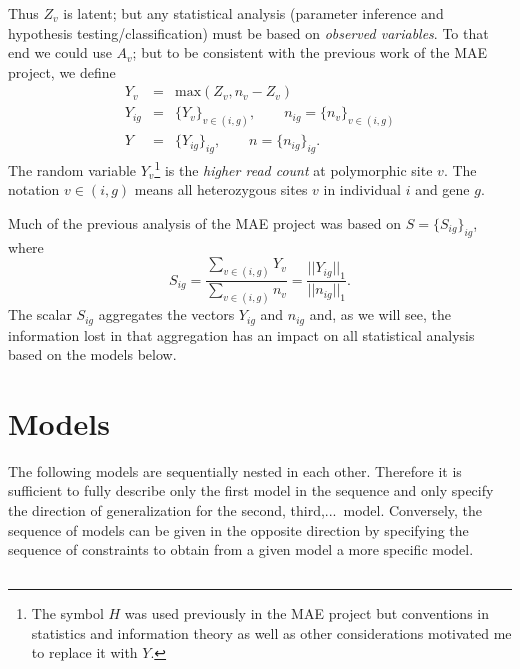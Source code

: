 \documentclass[letterpaper]{article}
\begin{document}
Thus \(Z_v\) is latent; but any statistical analysis (parameter inference and hypothesis
testing/classification) must be based on \emph{observed variables}.  To that
end we could use \(A_v\); but to be consistent with the previous work of the
MAE project, we define 
\begin{eqnarray}
\label{eq:Y-def}
Y_{v} &=& \mathrm{max}(Z_{v}, n_{v} - Z_{v}) \\
Y_{ig} &=&  \{Y_v\}_{v\in(i,g)}, \qquad n_{ig} = \{n_v\}_{v\in(i,g)} \\
Y &=&  \{Y_{ig}\}_{ig}, \qquad n = \{n_{ig}\}_{ig}.
\end{eqnarray}
The random variable \(Y_v\)\footnote{The symbol \(H\) was used previously in
the MAE project but conventions in statistics and information theory as well
as other considerations motivated me to replace it with \(Y\).} is the
\emph{higher read count} at polymorphic site \(v\).  The notation
\(v\in(i,g)\) means all heterozygous sites \(v\) in individual \(i\) and gene
\(g\).

Much of
the previous analysis of the MAE project was based on \(S = \{S_{ig}\}_{ig}\),
where
\begin{equation}
S_{ig} = \frac{\sum_{v\in(i,g)} Y_v}{ \sum_{v\in(i,g)} n_v} =
\frac{||Y_{ig}||_1}{||n_{ig}||_1}.
\end{equation}
The scalar \(S_{ig}\) aggregates the vectors \(Y_{ig}\) and \(n_{ig}\) and,
as we will see, the information lost in that aggregation has an impact on all
statistical analysis based on the models below.

\section{Models}
\label{sec:models}

The following models are sequentially nested in each other.  Therefore it is
sufficient to fully describe only the first model in the sequence and only
specify the direction of generalization for the second, third,...~model.
Conversely, the sequence of models can be given in the opposite direction by
specifying the sequence of constraints to obtain from a given model a
more specific model.

\renewcommand{\thesubsection}{M\arabic{model}}

\subsection{}
\label{sec:model-basic}
\end{document}
